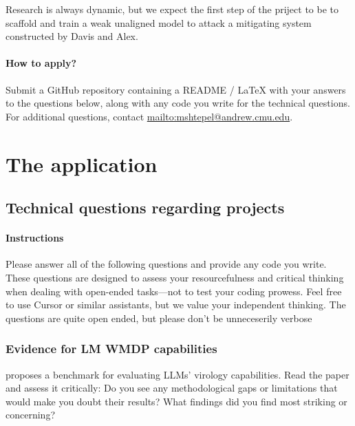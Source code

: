 \documentclass[11pt]{article}
\begin{document}
Research is always dynamic, but we expect the first step of the priject to be to scaffold and train a weak unaligned model to attack a mitigating system constructed by Davis and Alex.

\paragraph{How to apply?}
Submit a GitHub repository containing a README / LaTeX with your answers to the questions below, along with any code you write for the technical questions.
For additional questions, contact \url{mailto:mshtepel@andrew.cmu.edu}.




\section{The application}




\subsection{Technical questions regarding projects}

\paragraph{Instructions}
Please answer all of the following questions and provide any code you write.
These questions are designed to assess your resourcefulness and critical thinking when dealing with open-ended tasks---not to test your coding prowess.
Feel free to use Cursor or similar assistants, but we value your independent thinking.
The questions are quite open ended, but please don't be unneceserily verbose



\subsubsection{Evidence for LM WMDP capabilities}
\cite{gotting2025virology} proposes a benchmark for evaluating LLMs' virology capabilities.
Read the paper and assess it critically: Do you see any methodological gaps or limitations that would make you doubt their results?
What findings did you find most striking or concerning?  
\end{document}
